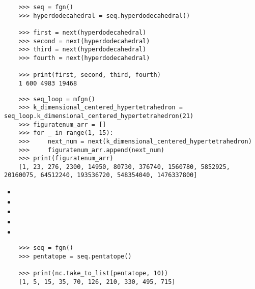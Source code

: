 \documentclass{article}
\begin{document}
\begin{multicols}{2}
  \begin{tcolorbox}[title= Generating FigurateNum Sequences Step by Step]
    \begin{lstlisting}
    >>> seq = fgn()
    >>> hyperdodecahedral = seq.hyperdodecahedral()

    >>> first = next(hyperdodecahedral)
    >>> second = next(hyperdodecahedral)
    >>> third = next(hyperdodecahedral)
    >>> fourth = next(hyperdodecahedral)

    >>> print(first, second, third, fourth)
    1 600 4983 19468
    \end{lstlisting}
  \end{tcolorbox}

  \begin{tcolorbox}[title = Example Using a Specific Class with a Loop]
    \begin{lstlisting}
    >>> seq_loop = mfgn()
    >>> k_dimensional_centered_hypertetrahedron = seq_loop.k_dimensional_centered_hypertetrahedron(21)
    >>> figuratenum_arr = []
    >>> for _ in range(1, 15):
    >>>     next_num = next(k_dimensional_centered_hypertetrahedron)
    >>>     figuratenum_arr.append(next_num)
    >>> print(figuratenum_arr)
    [1, 23, 276, 2300, 14950, 80730, 376740, 1560780, 5852925, 20160075, 64512240, 193536720, 548354040, 1476337800]
    \end{lstlisting}
  \end{tcolorbox}

\end{multicols}

\begin{multicols}{2}
  \begin{tcolorbox}[title= NumberCollector Class: Method Summary]
    \begin{itemize}[noitemsep, topsep=0pt]
      \item {}
      \item {}
      \item {}
      \item {}
      \item {}
    \end{itemize}
  \end{tcolorbox}

  \begin{tcolorbox}[title= Working with the NumberCollector Class]
    \begin{lstlisting}
    >>> seq = fgn()
    >>> pentatope = seq.pentatope()

    >>> print(nc.take_to_list(pentatope, 10))
    [1, 5, 15, 35, 70, 126, 210, 330, 495, 715]
    \end{lstlisting}
  \end{tcolorbox}
\end{multicols}
\end{document}
